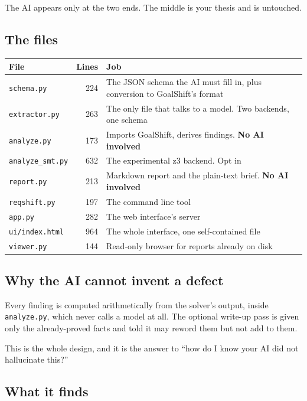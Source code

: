 \documentclass[11pt,a4paper]{article}
\begin{document}
The AI appears only at the two ends. The middle is your thesis and is untouched.

\subsection{The files}

\begin{center}
\begin{tabular}{@{}lrp{8.4cm}@{}}
\toprule
\textbf{File} & \textbf{Lines} & \textbf{Job} \\
\midrule
\texttt{schema.py} & 224 & The JSON schema the AI must fill in, plus conversion to GoalShift's format \\
\texttt{extractor.py} & 263 & The only file that talks to a model. Two backends, one schema \\
\texttt{analyze.py} & 173 & Imports GoalShift, derives findings. \textbf{No AI involved} \\
\texttt{analyze\_smt.py} & 632 & The experimental z3 backend. Opt in \\
\texttt{report.py} & 213 & Markdown report and the plain-text brief. \textbf{No AI involved} \\
\texttt{reqshift.py} & 197 & The command line tool \\
\texttt{app.py} & 282 & The web interface's server \\
\texttt{ui/index.html} & 964 & The whole interface, one self-contained file \\
\texttt{viewer.py} & 144 & Read-only browser for reports already on disk \\
\bottomrule
\end{tabular}
\end{center}

\subsection{Why the AI cannot invent a defect}

Every finding is computed arithmetically from the solver's output, inside
\texttt{analyze.py}, which never calls a model at all. The optional write-up pass is
given only the already-proved facts and told it may reword them but not add to them.

This is the whole design, and it is the answer to ``how do I know your AI did not
hallucinate this?''

\subsection{What it finds}
\end{document}

